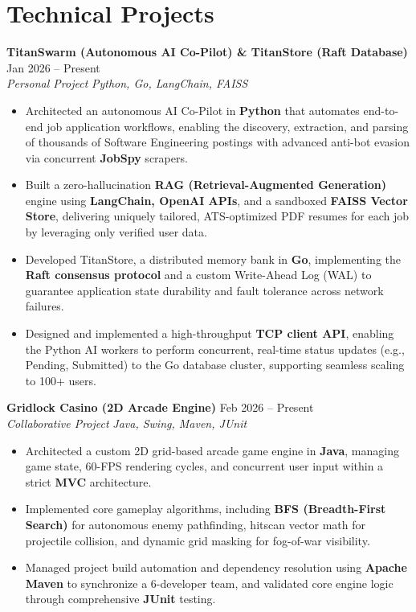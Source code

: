 \documentclass[10pt, letterpaper]{article}
\begin{document}
\section*{Technical Projects}

\noindent
\textbf{TitanSwarm (Autonomous AI Co-Pilot) \& TitanStore (Raft Database)} \hfill Jan 2026 -- Present \\
\textit{Personal Project} \hfill \textit{Python, Go, LangChain, FAISS}
\begin{itemize}
    \item Architected an autonomous AI Co-Pilot in \textbf{Python} that automates end-to-end job application workflows, enabling the discovery, extraction, and parsing of thousands of Software Engineering postings with advanced anti-bot evasion via concurrent \textbf{JobSpy} scrapers.
    \item Built a zero-hallucination \textbf{RAG (Retrieval-Augmented Generation)} engine using \textbf{LangChain, OpenAI APIs}, and a sandboxed \textbf{FAISS Vector Store}, delivering uniquely tailored, ATS-optimized PDF resumes for each job by leveraging only verified user data.
    \item Developed TitanStore, a distributed memory bank in \textbf{Go}, implementing the \textbf{Raft consensus protocol} and a custom Write-Ahead Log (WAL) to guarantee application state durability and fault tolerance across network failures.
    \item Designed and implemented a high-throughput \textbf{TCP client API}, enabling the Python AI workers to perform concurrent, real-time status updates (e.g., Pending, Submitted) to the Go database cluster, supporting seamless scaling to 100+ users.
\end{itemize}

\vspace{3pt}
\noindent
\textbf{Gridlock Casino (2D Arcade Engine)} \hfill Feb 2026 -- Present \\
\textit{Collaborative Project} \hfill \textit{Java, Swing, Maven, JUnit}
\begin{itemize}
    \item Architected a custom 2D grid-based arcade game engine in \textbf{Java}, managing game state, 60-FPS rendering cycles, and concurrent user input within a strict \textbf{MVC} architecture.
    \item Implemented core gameplay algorithms, including \textbf{BFS (Breadth-First Search)} for autonomous enemy pathfinding, hitscan vector math for projectile collision, and dynamic grid masking for fog-of-war visibility.
    \item Managed project build automation and dependency resolution using \textbf{Apache Maven} to synchronize a 6-developer team, and validated core engine logic through comprehensive \textbf{JUnit} testing.
\end{itemize}
\end{document}
